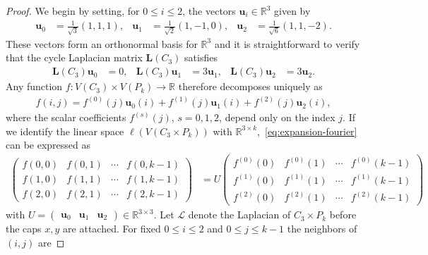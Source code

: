 \documentclass[10pt,a4paper]{amsart}
\begin{document}
\begin{proof}
    We begin by setting, for $0\leq i\leq 2$, the vectors $\mathbf{u}_i\in\mathbb{R}^3$ given by
        \begin{align*}
            \mathbf{u}_0&=\tfrac1{\sqrt3}(1,1,1),&
            \mathbf{u}_1&=\tfrac1{\sqrt2}(1,-1,0),&
            \mathbf{u}_2&=\tfrac1{\sqrt6}(1,1,-2).
        \end{align*}
    These vectors form an orthonormal basis for $\mathbb{R}^3$ and it is straightforward to verify that the cycle Laplacian matrix $\mathbf{L}(C_3)$ satisfies
        \begin{align*}
            \mathbf{L}({C_3})\mathbf{u}_0&=0,& 
            \mathbf{L}({C_3})\mathbf{u}_1&=3\mathbf{u}_1,&
            \mathbf{L}({C_3})\mathbf{u}_2&=3\mathbf{u}_2.
        \end{align*}
    Any function $f:V(C_3)\times V(P_k)\to\mathbb R$ therefore decomposes uniquely as
        \begin{align}\label{eq:expansion-fourier}
        f(i,j)=
            f^{(0)}(j)\mathbf{u}_0(i)+f^{(1)}(j)\mathbf{u}_1(i)+f^{(2)}(j)\mathbf{u}_2(i),
        \end{align}
    where the scalar coefficients $f^{(s)}(j)$, $s=0,1,2$, depend only on
    the index $j$. If we identify the linear space $\ell(V(C_3\times P_k))$ with $\mathbb{R}^{3\times k}$,~\cref{eq:expansion-fourier} can be expressed as
        \begin{align*}
            \begin{pmatrix}
            f(0,0) & f(0,1) & \cdots & f(0,k-1)\\
            f(1,0) & f(1,1) & \cdots & f(1,k-1)\\
            f(2,0) & f(2,1) & \cdots & f(2,k-1)
            \end{pmatrix}
            &=
            U
            \begin{pmatrix}
            f^{(0)}(0) & f^{(0)}(1) & \cdots & f^{(0)}(k-1)\\
            f^{(1)}(0) & f^{(1)}(1) & \cdots & f^{(1)}(k-1)\\
            f^{(2)}(0) & f^{(2)}(1) & \cdots & f^{(2)}(k-1)
            \end{pmatrix}
        \end{align*}
    with $U = \begin{pmatrix}
        \mathbf{u}_0 & \mathbf{u}_1 & \mathbf{u}_2
    \end{pmatrix}\in\mathbb{R}^{3\times 3}$. Let $\mathcal L$ denote the Laplacian of $C_3\times P_k$ {before} the caps $x,y$ are attached. For fixed $0\leq i \leq 2$ and $0\leq j\leq k-1$ the neighbors of $(i,j)$ are

\end{proof}
\end{document}
